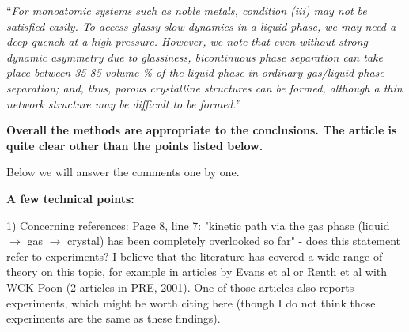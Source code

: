 \documentclass[11pt,a4paper]{article}
\newenvironment{referee}%
{\bigskip\singlespacing\bf}%
{\par\bigskip}
\begin{document}
``{\it For monoatomic systems such as noble metals, condition (iii) may not be satisfied easily. 
To access glassy slow dynamics in a liquid phase, we may need a deep quench at a high pressure. However, we note that even without strong dynamic asymmetry 
due to glassiness, bicontinuous phase separation can take place between 35-85 volume \% of the liquid phase in ordinary gas/liquid phase separation; 
and, thus, porous crystalline structures can be formed, although a thin network structure may be difficult to be formed.}''


\begin{referee}
Overall the methods are appropriate to the conclusions. The article is quite clear other than the points listed below.
\end{referee}

Below we will answer the comments one by one. 


\begin{referee}
A few technical points:

1) Concerning references: Page 8, line 7: "kinetic path via the gas phase (liquid $\rightarrow$ gas $\rightarrow$ crystal) has been completely overlooked so far" - does this statement refer to experiments? I believe that the literature has covered a wide range of theory on this topic, for example in articles by Evans et al or Renth et al with WCK Poon (2 articles in PRE, 2001). One of those articles also reports experiments, which might be worth citing here (though I do not think those experiments are the same as these findings).
\end{referee}
\end{document}
